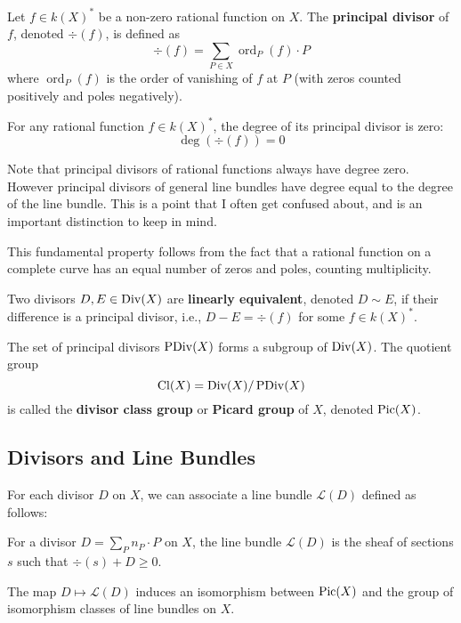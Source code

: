 \documentclass[12pt]{article}
\begin{document}
\begin{definition}
    Let $f \in k(X)^*$ be a non-zero rational function on $X$. The \textbf{principal divisor} of $f$, denoted $\div(f)$, is defined as
    \[\div(f) = \sum_{P \in X} \operatorname{ord}_P(f) \cdot P\]
    where $\operatorname{ord}_P(f)$ is the order of vanishing of $f$ at $P$ (with zeros counted positively and poles negatively).
\end{definition}

\begin{proposition}
    For any rational function $f \in k(X)^*$, the degree of its principal divisor is zero:
    \[\deg(\div(f)) = 0\]
\end{proposition}

\begin{remark}
    Note that principal divisors of rational functions always have degree zero. However principal divisors of general line bundles have degree equal to the degree of the line bundle. This is a point that I often get confused about, and is an important distinction to keep in mind.
\end{remark}

This fundamental property follows from the fact that a rational function on a complete curve has an equal number of zeros and poles, counting multiplicity.

\begin{definition}
    Two divisors $D, E \in \operatorname{Div}(X)$ are \textbf{linearly equivalent}, denoted $D \sim E$, if their difference is a principal divisor, i.e., $D - E = \div(f)$ for some $f \in k(X)^*$.
\end{definition}

The set of principal divisors $\operatorname{PDiv}(X)$ forms a subgroup of $\operatorname{Div}(X)$. The quotient group \[\operatorname{Cl}(X) = \operatorname{Div}(X)/\operatorname{PDiv}(X)\] is called the \textbf{divisor class group} or \textbf{Picard group} of $X$, denoted $\operatorname{Pic}(X)$.

\subsection{Divisors and Line Bundles}

For each divisor $D$ on $X$, we can associate a line bundle $\mathcal{L}(D)$ defined as follows:
\begin{definition}
    For a divisor $D = \sum_P n_P \cdot P$ on $X$, the line bundle $\mathcal{L}(D)$ is the sheaf of sections $s$ such that $\div(s) + D \geq 0$.
\end{definition}
\begin{theorem}
    The map $D \mapsto \mathcal{L}(D)$ induces an isomorphism between $\operatorname{Pic}(X)$ and the group of isomorphism classes of line bundles on $X$.
\end{theorem}
\end{document}
